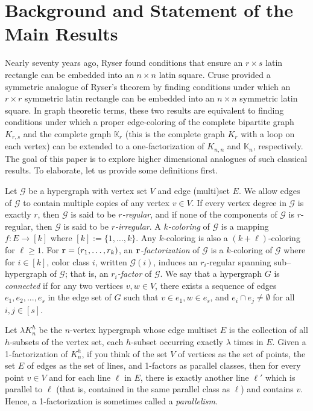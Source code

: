 \documentclass[12pt,oneside]{amsart}
\newcommand{\cc}{\mathcal}
\begin{document}
\section{Background and  Statement of the Main Results} 
Nearly seventy years ago, Ryser \cite{MR42361} found conditions that ensure  an $r\times s$ latin rectangle can be embedded into an $n\times n$ latin square.  Cruse \cite{MR0329925} provided a symmetric analogue of Ryser's theorem by finding conditions under which an  $r\times r$ symmetric latin rectangle can be embedded into an $n\times n$ symmetric  latin square. In graph theoretic terms, these two results are equivalent to finding conditions under which a proper edge-coloring of the complete bipartite graph $K_{r,s}$ and  the complete graph $\mathbb K_r$ (this is the complete graph $K_r$ with a loop on each vertex) can be extended to a one-factorization of $K_{n,n}$ and  $\mathbb K_n$, respectively.  
The goal of this paper is to explore  higher dimensional analogues of such classical results. To elaborate, let us provide some definitions first.

Let $\cc G$ be a hypergraph with vertex set $V$ and edge (multi)set $E$. We allow edges of $\cc G$ to contain multiple copies of any vertex $v\in V$. If  every vertex  degree in $\cc G$ is exactly  $r$, then $\cc G$ is said to be {\it  $r$-regular}, and if none of the components of $\cc G$ is $r$-regular, then $\cc G$ is said to be {\it $r$-irregular}.  A {\it  $k$-coloring} of $\cc G$ is a mapping $f: E \rightarrow [k]$ where $[k]:=\{1,\dots, k\}$. Any $k$-coloring is also a $(k+\ell)$-coloring for $\ell\geq 1$. For $\vb r=(r_1,\dots,r_k)$, an {\it $\vb r$-factorization} of $\cc G$ is a $k$-coloring of $\cc G$ where for $i\in [k]$, color class  $i$, written $\cc G(i)$, induces  an $r_i$-regular spanning sub--hypergraph of $\cc G$; that is, an {\it $r_i$-factor} of $\cc G$. We say that a hypergraph $G$ is {\it connected} if for any two vertices $v, w \in V$, there exists a sequence of edges $e_1, e_2, ..., e_s$ in the edge set of $G$ such that $v\in e_1, w\in e_s$, and $e_i\cap e_j \neq \emptyset$ for all $i,j\in[s]$. 

Let $\lambda K_n^h$ be the $n$-vertex hypergraph whose edge multiset $E$ is  the collection of all $h$-subsets of the vertex set, each $h$-subset occurring exactly $\lambda$ times in $E$. Given a 1-factorization of $K_n^h$, if you think of the set $V$ of vertices  as the set of points, the set $E$ of edges as the set of lines, and 1-factors  as parallel classes, then  for every point $v \in V$ and for each line $\ell$ in $E$, there is exactly another line $\ell'$ which is parallel to $\ell$ (that is, contained in the same parallel class as $\ell$) and contains $v$. Hence, a 1-factorization is sometimes called  a {\it parallelism}.
\end{document}
